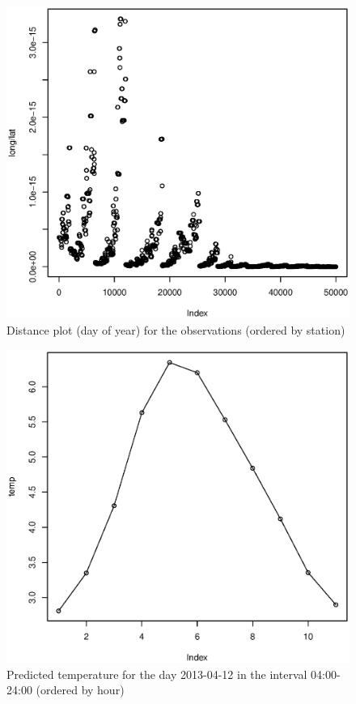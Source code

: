 \documentclass[a4paper, 12pt]{article}
\begin{document}
    \begin{figure}[H]
    \centering
    \caption{Distance plot (day of year) for the observations (ordered by station)\label{fig:dist}}
	    \begin{minipage}[]{0.4\textwidth}
	    	\includegraphics[width=\textwidth]{share/1_dist.eps}
	    \end{minipage}
    \end{figure}

    \begin{figure}[H]
    \centering
    \caption{Predicted temperature for the day 2013-04-12 in the interval 04:00-24:00 (ordered by hour)\label{fig:result}}
	    \begin{minipage}[]{0.4\textwidth}
	    	\includegraphics[width=\textwidth]{share/result.eps}
	    \end{minipage}
    \end{figure}
\end{document}
